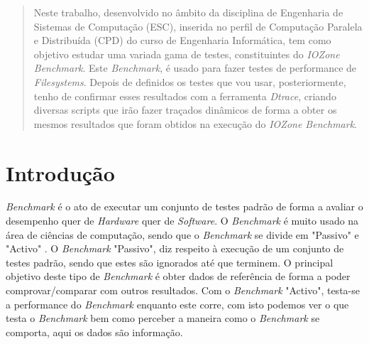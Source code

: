 \documentclass[conference,compsoc]{IEEEtran}
\begin{document}
\maketitle
\tableofcontents
\vspace{0.5cm}

\begin{abstract}
Neste trabalho, desenvolvido no âmbito da disciplina de Engenharia de Sistemas de Computação (ESC), inserida no perfil de Computação Paralela e Distribuída (CPD) do curso de Engenharia Informática, tem como objetivo estudar uma variada gama de testes, constituintes do \textit{IOZone Benchmark}. Este \textit{Benchmark}, é usado para fazer testes de performance de \textit{Filesystems}. Depois de definidos os testes que vou usar, posteriormente, tenho de confirmar esses resultados com a ferramenta \textit{Dtrace}, criando diversas scripts que irão fazer traçados dinâmicos de forma a obter os mesmos resultados que foram obtidos na execução do \textit{IOZone Benchmark}.
\end{abstract}





%
\IEEEpeerreviewmaketitle



\section{Introdução}
\textit{Benchmark}\cite{bench} é o ato de executar um conjunto de testes padrão de forma a avaliar o desempenho quer de \textit{Hardware} quer de \textit{Software}. O \textit{Benchmark} é muito usado na área de ciências de computação, sendo que o \textit{Benchmark} se divide em "Passivo" e "Activo" \cite{bench_act_pass}. O \textit{Benchmark} "Passivo", diz respeito à execução de um conjunto de testes padrão, sendo que estes são ignorados até que terminem.  O principal objetivo deste tipo de \textit{Benchmark} é obter dados de referência de forma a poder comprovar/comparar com outros resultados. Com o \textit{Benchmark} "Activo", testa-se a performance do \textit{Benchmark} enquanto este corre, com isto podemos ver o que testa o \textit{Benchmark} bem como perceber a maneira como o \textit{Benchmark} se comporta, aqui os dados são informação.
\end{document}
